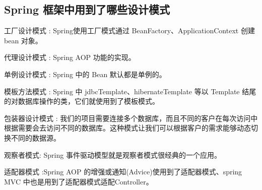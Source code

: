 \documentclass[../../../interview-questions.tex]{subfiles}
\begin{document}
\subsection{Spring 框架中用到了哪些设计模式}

工厂设计模式 : Spring使用工厂模式通过 BeanFactory、ApplicationContext 创建 bean 对象。

代理设计模式 : Spring AOP 功能的实现。

单例设计模式 : Spring 中的 Bean 默认都是单例的。

模板方法模式 : Spring 中 jdbcTemplate、hibernateTemplate 等以 Template 结尾的对数据库操作的类，它们就使用到了模板模式。

包装器设计模式 : 我们的项目需要连接多个数据库，而且不同的客户在每次访问中根据需要会去访问不同的数据库。这种模式让我们可以根据客户的需求能够动态切换不同的数据源。

观察者模式: Spring 事件驱动模型就是观察者模式很经典的一个应用。

适配器模式 :Spring AOP 的增强或通知(Advice)使用到了适配器模式、spring MVC 中也是用到了适配器模式适配Controller。
\end{document}
